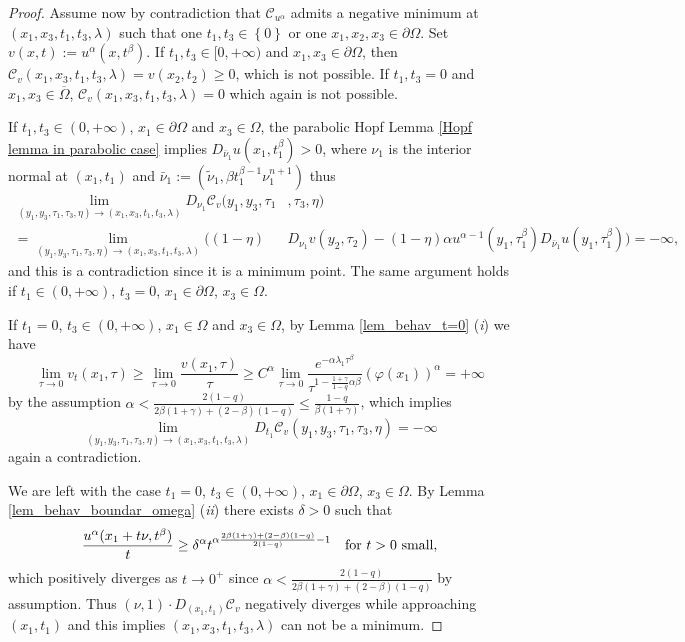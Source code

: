 \documentclass[11pt, reqno]{amsart}
\theoremstyle{definition}
\numberwithin{equation}{section}
\newcommand{\Omegabar}{\overline{\Omega}}
\begin{document}
\begin{proof}
	Assume now by contradiction that $\mathcal{C}_{u^\alpha}$ admits a negative minimum at $(x_1,x_3,t_1,t_3,\lambda)$ such that one $t_1,t_3\in \left\{0\right\}$ or one $x_1,x_2,x_3\in \partial \Omega$. Set $v(x,t):=u^{\alpha}(x, t^{\beta})$. 
	If $t_1,t_3\in [0,+\infty)$ and $x_1,x_3\in \partial \Omega$, then $\mathcal{C}_v(x_1,x_3,t_1,t_3,\lambda)=v(x_2,t_2) \geq 0$, which is not possible. If $t_1,t_3=0$ and $x_1,x_3\in \Omegabar$, $\mathcal{C}_v(x_1,x_3,t_1,t_3,\lambda)= 	0$ which again is not possible. 
	
		If $t_1,t_3\in (0,+\infty)$, $x_1\in \partial \Omega$ and $x_3\in \Omega$, the parabolic Hopf Lemma \ref{Hopf lemma in parabolic case} implies $D_{\bar{\nu}_1}u (x_1, t_1^{\beta}) >0$, where $\nu_1$ is the interior normal at $(x_1,t_1)$ and $\bar{\nu}_1:=(\tilde{\nu}_1, \beta t_1^{\beta-1}\nu_1^{n+1})$ thus
	\begin{align*}
\lim_{(y_1,y_3,\tau_1,\tau_3,\eta)\to(x_1,x_3,t_1,t_3,\lambda)}D_{\nu_1}\mathcal{C}_v(y_1,y_3,\tau_1&,\tau_3,\eta)\\=\lim_{(y_1,y_3,\tau_1,\tau_3,\eta)\to(x_1,x_3,t_1,t_3,\lambda)}\bigg((1-\eta)&D_{\nu_1}v(y_2,\tau_2)-(1-\eta)\alpha u^{\alpha-1}(y_1,\tau_1^{\beta})
D_{\bar{\nu}_1} u(y_1, \tau_1^{\beta}) \bigg)=-\infty,
	\end{align*}
		and this is a contradiction since it is a minimum point. 
		The same argument holds if $t_1\in (0,+\infty)$, $t_3=0$, $x_1\in \partial \Omega$, $x_3\in \Omega$.
	
	If $t_1=0$, $t_3\in (0,+\infty)$, $x_1\in \Omega$ and $x_3\in \Omega$, by Lemma \ref{lem_behav_t=0} (\textit{i}) we have
	$$\lim_{\tau \to 0} v_t(x_1,\tau)\geq \lim_{\tau \to 0} \frac{v(x_1, \tau)}{\tau} \geq 
	C^{\alpha} \lim_{\tau \to 0} \frac{e^{-\alpha \lambda_1 \tau^{\beta}}}{\tau^{1-\frac{1+\gamma}{1-q}\alpha \beta}} (\varphi(x_1))^{\alpha} = +\infty$$
by the assumption $\alpha < \frac{2(1-q)}{2\beta(1+\gamma)+(2-\beta)(1-q)} \leq \frac{1-q}{\beta(1+\gamma)}$, 
	which implies 
	$$\lim_{(y_1,y_3,\tau_1,\tau_3,\eta)\to(x_1,x_3,t_1,t_3,\lambda)} D_{t_1}\mathcal{C}_v(y_1,y_3,\tau_1,\tau_3,\eta)=-\infty$$ 
	again a contradiction. 
	
We are left with the case $t_1=0$, $t_3\in (0,+\infty)$, $x_1\in \partial \Omega$, $x_3 \in \Omega$. 
	By Lemma \ref{lem_behav_boundar_omega} (\textit{ii}) there exists $\delta>0$ such that $$\frac{u^\alpha(x_1 +t\nu , t^{\beta})}{t}\geq \delta^\alpha t^{\alpha \frac{2\beta(1+\gamma)+(2-\beta)(1-q) }{2(1-q)} -1}\quad \hbox{for $t>0$ small},$$
	which positively diverges as $t\to 0^+$ since $\alpha < \frac{2(1-q)}{2\beta(1+\gamma)+(2-\beta)(1-q)}$ by assumption. 
	Thus $(\nu, 1) \cdot D_{(x_1, t_1)}\mathcal{C}_v$ negatively diverges while approaching $(x_1,t_1)$ and this implies $(x_1,x_3,t_1,t_3,\lambda)$ can not be a minimum.
\end{proof}
\end{document}
